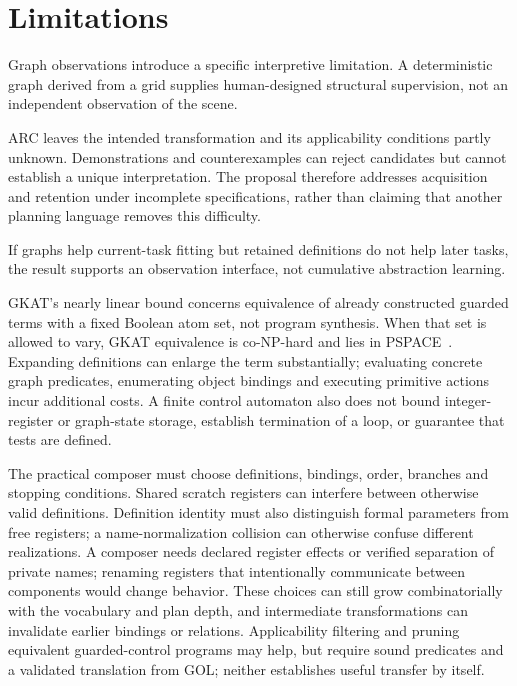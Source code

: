 \documentclass[11pt]{article}
\begin{document}
\section{Limitations}\label{limitations:composition}
Graph observations introduce a specific interpretive limitation. A deterministic graph derived from a grid supplies human-designed structural supervision, not an independent observation of the scene.

ARC leaves the intended transformation and its applicability conditions partly unknown. Demonstrations and counterexamples can reject candidates but cannot establish a unique interpretation. The proposal therefore addresses acquisition and retention under incomplete specifications, rather than claiming that another planning language removes this difficulty.

If graphs help current-task fitting but retained definitions do not help later tasks, the result supports an observation interface, not cumulative abstraction learning.

GKAT's nearly linear bound concerns equivalence of already constructed guarded terms with a fixed Boolean atom set, not program synthesis. When that set is allowed to vary, GKAT equivalence is co-NP-hard and lies in PSPACE~\cite[Proposition 5.11]{gkat}. Expanding definitions can enlarge the term substantially; evaluating concrete graph predicates, enumerating object bindings and executing primitive actions incur additional costs. A finite control automaton also does not bound integer-register or graph-state storage, establish termination of a loop, or guarantee that tests are defined.

The practical composer must choose definitions, bindings, order, branches and stopping conditions. Shared scratch registers can interfere between otherwise valid definitions. Definition identity must also distinguish formal parameters from free registers; a name-normalization collision can otherwise confuse different realizations. A composer needs declared register effects or verified separation of private names; renaming registers that intentionally communicate between components would change behavior. These choices can still grow combinatorially with the vocabulary and plan depth, and intermediate transformations can invalidate earlier bindings or relations. Applicability filtering and pruning equivalent guarded-control programs may help, but require sound predicates and a validated translation from GOL; neither establishes useful transfer by itself.
\end{document}
